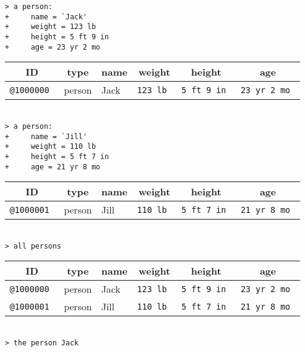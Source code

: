 \documentclass[12pt]{article}
\newenvironment{indpar}[1][0.3in]%
	{\begin{list}{}%
		     {\setlength{\itemsep}{0in}%
		      \setlength{\topsep}{0in}%
		      \setlength{\parsep}{1ex}%
		      \setlength{\labelwidth}{#1}%
		      \setlength{\leftmargin}{#1}%
		      \addtolength{\leftmargin}{\labelsep}}%
	 \item}%
	{\end{list}}
\begin{document}
\begin{indpar}
\verb|> a person:| \\
\verb|+     name = `Jack'| \\
\verb|+     weight = 123 lb| \\
\verb|+     height = 5 ft 9 in| \\
\verb|+     age = 23 yr 2 mo| \\
\begin{tabular}{|r|l|l|r|r|r|}
\hline
\multicolumn{1}{|c}{\bf ID} &
\multicolumn{1}{|c}{\bf type} &
\multicolumn{1}{|c}{\bf name} &
\multicolumn{1}{|c}{\bf weight} &
\multicolumn{1}{|c}{\bf height} &
\multicolumn{1}{|c|}{\bf age} \\
\hline
\tt @1000000 & person & Jack & \tt 123 lb & \tt 5 ft 9 in & \tt 23 yr 2 mo \\
\hline
\end{tabular} \\[0.5ex]
\verb|> a person:| \\
\verb|+     name = `Jill'| \\
\verb|+     weight = 110 lb| \\
\verb|+     height = 5 ft 7 in| \\
\verb|+     age = 21 yr 8 mo| \\
\begin{tabular}{|r|l|l|r|r|r|}
\hline
\multicolumn{1}{|c}{\bf ID} &
\multicolumn{1}{|c}{\bf type} &
\multicolumn{1}{|c}{\bf name} &
\multicolumn{1}{|c}{\bf weight} &
\multicolumn{1}{|c}{\bf height} &
\multicolumn{1}{|c|}{\bf age} \\
\hline
\tt @1000001 & person & Jill & \tt 110 lb & \tt 5 ft 7 in & \tt 21 yr 8 mo \\
\hline
\end{tabular} \\[0.5ex]
\verb|> all persons| \\
\begin{tabular}{|r|l|l|r|r|r|}
\hline
\multicolumn{1}{|c}{\bf ID} &
\multicolumn{1}{|c}{\bf type} &
\multicolumn{1}{|c}{\bf name} &
\multicolumn{1}{|c}{\bf weight} &
\multicolumn{1}{|c}{\bf height} &
\multicolumn{1}{|c|}{\bf age} \\
\hline
\tt @1000000 & person & Jack & \tt 123 lb & \tt 5 ft 9 in & \tt 23 yr 2 mo \\
\tt @1000001 & person & Jill & \tt 110 lb & \tt 5 ft 7 in & \tt 21 yr 8 mo \\
\hline
\end{tabular} \\[0.5ex]
\verb|> the person Jack| \\

\end{indpar}
\end{document}
